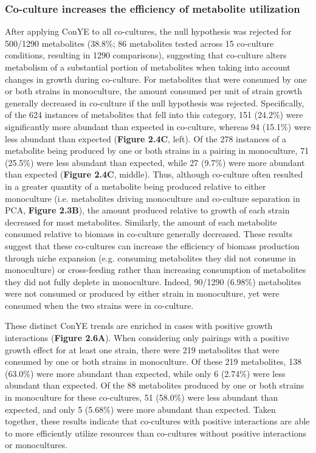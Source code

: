 \documentclass[11pt,twocolumn,notitlepage,openany,twoside]{book}
\begin{document}
\begin{refsection}
\subsubsection{Co-culture increases the efficiency of metabolite utilization}

After applying ConYE to all co-cultures, the null hypothesis was rejected for 500/1290 metabolites (38.8\%; 86 metabolites tested across 15 co-culture conditions, resulting in 1290 comparisons), suggesting that co-culture alters metabolism of a substantial portion of metabolites when taking into account changes in growth during co-culture. For metabolites that were consumed by one or both strains in monoculture, the amount consumed per unit of strain growth generally decreased in co-culture if the null hypothesis was rejected. Specifically, of the 624 instances of metabolites that fell into this category, 151 (24.2\%) were significantly more abundant than expected in co-culture, whereas 94 (15.1\%) were less abundant than expected (\textbf{Figure 2.4C}, left). Of the 278 instances of a metabolite being produced by one or both strains in a pairing in monoculture, 71 (25.5\%) were less abundant than expected, while 27 (9.7\%) were more abundant than expected (\textbf{Figure 2.4C}, middle). Thus, although co-culture often resulted in a greater quantity of a metabolite being produced relative to either monoculture (i.e. metabolites driving monoculture and co-culture separation in PCA, \textbf{Figure 2.3B}), the amount produced relative to growth of each strain decreased for most metabolites. Similarly, the amount of each metabolite consumed relative to biomass in co-culture generally decreased. These results suggest that these co-cultures can increase the efficiency of biomass production through niche expansion (e.g. consuming metabolites they did not consume in monoculture) or cross-feeding rather than increasing consumption of metabolites they did not fully deplete in monoculture. Indeed, 90/1290 (6.98\%) metabolites were not consumed or produced by either strain in monoculture, yet were consumed when the two strains were in co-culture.

These distinct ConYE trends are enriched in cases with positive growth interactions (\textbf{Figure 2.6A}). When considering only pairings with a positive growth effect for at least one strain, there were 219 metabolites that were consumed by one or both strains in monoculture. Of these 219 metabolites, 138 (63.0\%) were more abundant than expected, while only 6 (2.74\%) were less abundant than expected. Of the 88 metabolites produced by one or both strains in monoculture for these co-cultures, 51 (58.0\%) were less abundant than expected, and only 5 (5.68\%) were more abundant than expected. Taken together, these results indicate that co-cultures with positive interactions are able to more efficiently utilize resources than co-cultures without positive interactions or monocultures.


\end{refsection}
\end{document}
